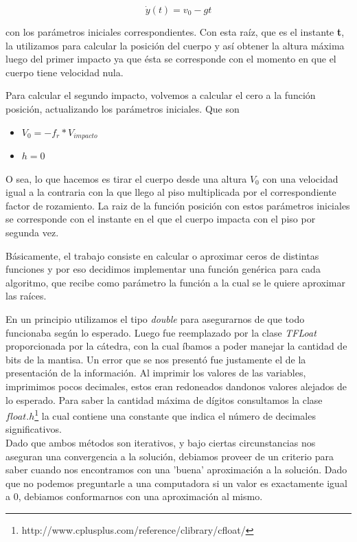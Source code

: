 \documentclass[a4paper]{article}
\begin{document}
\begin{equation}
 \dot{y}(t) = v_0 - g t
\end{equation}

con los parámetros iniciales correspondientes. Con esta raíz, que es el instante \textbf{t}, la utilizamos para calcular la posición del cuerpo y así obtener la altura máxima luego del primer impacto ya que ésta se corresponde con el momento en que el cuerpo tiene velocidad nula.\\ \hspace{1em}

Para calcular el segundo impacto, volvemos a calcular el cero a la función posición,  actualizando los parámetros iniciales. Que son 

\begin{itemize}
 	\item $V_0 = -f_r *V_{impacto} $
	\item $h = 0$ 
\end{itemize}

O sea, lo que hacemos es tirar el cuerpo desde una altura $V_0$ con una velocidad igual a la contraria con la que llego al piso multiplicada por el correspondiente factor de rozamiento. La raiz de la función posición con estos parámetros iniciales se corresponde con el instante en el que el cuerpo impacta con el piso por segunda vez.


\hspace{1em}


Básicamente, el trabajo consiste en calcular o aproximar ceros de distintas funciones y por eso decidimos implementar una función genérica para cada algoritmo, que recibe como parámetro la función a la cual se le quiere aproximar las raíces. 

En un principio utilizamos el tipo \textit{double} para asegurarnos de que todo funcionaba según lo esperado. Luego fue reemplazado por la clase \textit{TFLoat} proporcionada por la cátedra, con la cual íbamos a poder manejar la cantidad de bits de la mantisa.   
Un error que se nos presentó fue justamente el de la presentación de la información. Al imprimir los valores de las variables, imprimimos pocos decimales, estos eran redoneados dandonos valores alejados de lo esperado. Para saber la cantidad máxima de dígitos consultamos la clase $float.h$\footnote{http://www.cplusplus.com/reference/clibrary/cfloat/} la cual contiene una constante que indica el número de decimales significativos. \\[1em]

Dado que ambos métodos son iterativos, y bajo ciertas circunstancias nos aseguran una convergencia a la solución, debiamos proveer de un criterio para saber cuando nos encontramos con una 'buena' aproximación a la solución. Dado que no podemos preguntarle a una computadora si un valor es exactamente igual a 0, debiamos conformarnos con una aproximación al mismo.
\end{document}
